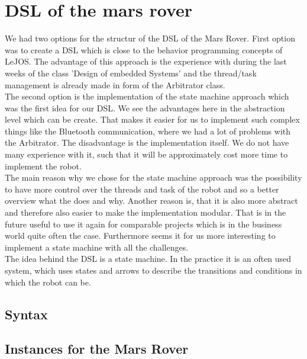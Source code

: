 \documentclass[10pt,a4paper]{article}
\begin{document}
\section*{DSL of the mars rover}
We had two options for the structur of the DSL of the Mars Rover. First option was to create a DSL which is close to the behavior programming concepts of LeJOS. The advantage of this approach is the experience with during the last weeks of the class 'Design of embedded Systems' and the thread/task management is already made in form of the Arbitrator class.\\
The second option is the implementation of the state machine approach which was the first idea for our DSL. We see the advantages here in the abstraction level which can be create. That makes it easier for us to implement such complex things like the Bluetooth communication, where we had a lot of problems with the Arbitrator. The disadvantage is the implementation itself. We do not have many experience with it, such that it will be approximately cost more time to implement the robot.\\
The main reason why we chose for the state machine approach was the possibility to have more control over the threads and task of the robot and so a better overview what the does and why. Another reason is, that it is also more abstract and therefore also easier to make the implementation modular. That is in the future useful to use it again for comparable projects which is in the business world quite often the case.  Furthermore seems it for us more interesting to implement a state machine with all the challenges. \\

The idea behind the DSL is a state machine. In the practice it is an often used system, which uses states and arrows to describe the transitions and conditions in which the robot can be. 

\subsection*{Syntax} 
\subsection*{Instances for the Mars Rover}
\end{document}
